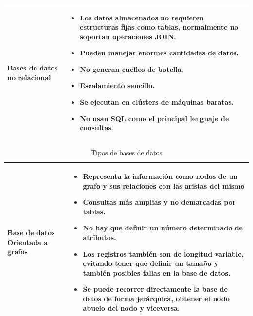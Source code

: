 \begin{table}[b!]
\begin{tabular}{|p{2cm}|ll}
        \hline
          \multicolumn{1}{|p{5cm}|}{Bases de datos no relacional} & 
          \multicolumn{1}{p{10cm}|}{
          \begin{itemize}
          \vspace{-5mm}
          \item Los datos almacenados no requieren estructuras fijas como tablas, normalmente no soportan operaciones JOIN.
        \item Pueden manejar enormes cantidades de datos.
        \item No generan cuellos de botella.
        \item Escalamiento sencillo.
        \item Se ejecutan en clústers de máquinas baratas.
        \item No usan SQL como el principal lenguaje de consultas \cite{29}
      \end{itemize}} \\ 
       \hline
      \end{tabular}
    \end{table}

\newpage
	\begin{table}[b!]
    \centering
    \vspace{-5mm}
      \begin{tabular}{|p{2cm}|ll}
        \hline
          \multicolumn{1}{|p{5cm}|}{Base de datos Orientada a grafos} & 
          \multicolumn{2}{p{10cm}|}{\begin{itemize}
          \vspace{-5mm}
        \item Representa la información como nodos de un grafo y sus relaciones con las aristas del mismo
        \item Consultas más amplias y no demarcadas por tablas.
        \item No hay que definir un número determinado de atributos.
        \item Los registros también son de longitud variable, evitando tener que definir un tamaño y también posibles fallas en la base de datos.
        \item Se puede recorrer directamente la base de datos de forma jerárquica, obtener el nodo abuelo del nodo y viceversa.
        \cite{30}
      \end{itemize}} \\
       \hline
      \end{tabular}
      \caption{Tipos de bases de datos}
      \label{table: comparacion de bd}
    \end{table}
    
